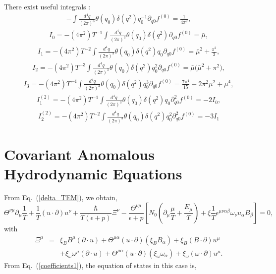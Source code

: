 \documentclass[aps,prd,showkeys,preprint,amsmath,amssymb,nofootinbib]{revtex4-1}
\begin{document}
There exist useful integrals : 
\begin{eqnarray}
-\int\frac{d^{4}q}{(2\pi)^{3}}\theta(q_{0})\delta(q^{2})q_{0}^{-1}\partial_{q0}f^{(0)}=\frac{1}{4\pi^{2}},\label{def_lambda}
\end{eqnarray}
\begin{eqnarray}
I_{0}=-(4\pi^2)T^{-1}\int\frac{d^{4}q}{(2\pi)^{3}}\theta(q_{0})\delta(q^{2})\partial_{q0}f^{(0)}=\bar{\mu},
\end{eqnarray}
\begin{eqnarray}
I_{1}=-(4\pi^2)T^{-2}\int\frac{d^{4}q}{(2\pi)^{3}}\theta(q_{0})\delta(q^{2})q_{0}\partial_{q0}f^{(0)}=\bar{\mu}^{2}+\frac{\pi^{2}}{3},
\end{eqnarray}
\begin{eqnarray}
I_{2}=-(4\pi^2)T^{-3}\int\frac{d^{4}q}{(2\pi)^{3}}\theta(q_{0})\delta(q^{2})q_{0}^{2}\partial_{q0}f^{(0)}=\bar{\mu}\big(\bar{\mu}^{2}+\pi^{2}\big),
\end{eqnarray}
\begin{eqnarray}
I_{3}=-(4\pi^2)T^{-4}\int\frac{d^{4}q}{(2\pi)^{3}}\theta(q_{0})\delta(q^{2})q_{0}^{3}\partial_{q0}f^{(0)}=\frac{7\pi^{4}}{15}+2\pi^{2}\bar{\mu}^{2}+\bar{\mu}^{4},
\end{eqnarray}
\begin{eqnarray}
I_{1}^{(2)}=-(4\pi^2)T^{-1}\int\frac{d^{4}q}{(2\pi)^{3}}\theta(q_{0})\delta(q^{2})q_{0}\partial_{q0}^{2}f^{(0)}=-2I_{0},
\end{eqnarray}
\begin{eqnarray}\label{def_I22}
I_{2}^{(2)}=-(4\pi^2)T^{-2}\int\frac{d^{4}q}{(2\pi)^{3}}\theta(q_{0})\delta(q^{2})q_{0}^{2}\partial_{q0}^{2}f^{(0)}=-3I_{1}
\end{eqnarray}


\section{Covariant Anomalous Hydrodynamic Equations \label{Ahydro}}

From Eq.~(\ref{delta_TEM}), we obtain,
\begin{equation}
\Theta^{\nu\mu}\partial_{\mu}\frac{1}{T}+\frac{1}{T}(u\cdot\partial)u^{\nu}+\frac{\hbar}{T(\epsilon+p)} \Xi^{\nu}-\frac{\Theta^{\nu\mu}}{\epsilon+p}\left[N_{0}\left(\partial_{\mu}\frac{\mu}{T}+\frac{E_{\mu}}{T}\right)+\xi\frac{1}{T}\epsilon^{\mu\nu\alpha\beta}\omega_{\nu}u_{\alpha}B_{\beta}\right]=0,\label{eq:temp_identity_ideal_fluid}
\end{equation}
with 
\begin{eqnarray}
\Xi^{\mu} & = & \xi_{B}B^{\mu}(\partial\cdot u)+\Theta^{\mu\alpha}(u\cdot\partial)(\xi_{B}B_{\alpha})+\xi_{B}(B\cdot\partial)u^{\mu}\nonumber \\
 &  & +\xi_{\omega}\omega^{\mu}(\partial\cdot u)+\Theta^{\mu\alpha}(u\cdot\partial)(\xi_{\omega}\omega_{\alpha})+\xi_{\omega}(\omega\cdot\partial)u^{\mu}.
\end{eqnarray}
From Eq.~(\ref{coefficients1}), the equation of states in this case
is,
\end{document}
